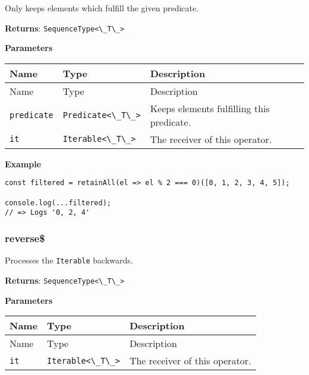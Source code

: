 Only keeps elements which fulfill the given predicate.

\textbf{Returns}: \passthrough{\lstinline!SequenceType<\_T\_>!}

\textbf{Parameters}

\begin{longtable}[]{
  >{\raggedright\arraybackslash}p{}
  >{\raggedright\arraybackslash}p{}
  >{\raggedright\arraybackslash}p{}@{}}

\toprule\noalign{}
Name & Type & Description \\
\midrule\noalign{}
\endfirsthead
\toprule\noalign{}
Name & Type & Description \\
\midrule\noalign{}
\endhead
\bottomrule\noalign{}
\endlastfoot
\passthrough{\lstinline!predicate!} &
\passthrough{\lstinline!Predicate<\_T\_>!} & Keeps elements fulfilling
this predicate. \\
\passthrough{\lstinline!it!} & \passthrough{\lstinline!Iterable<\_T\_>!}
& The receiver of this operator. \\
\end{longtable}

\textbf{Example}

\begin{lstlisting}[label=8a34b1cf-0a5d-4f78-876d-3d2977eb069b]
const filtered = retainAll(el => el % 2 === 0)([0, 1, 2, 3, 4, 5]);

console.log(...filtered);
// => Logs '0, 2, 4'
\end{lstlisting}

\hypertarget{cfab75a9-3295-4c45-be64-d5e9dc24f024}{%
\subsubsection{reverse\$}\label{cfab75a9-3295-4c45-be64-d5e9dc24f024}}

Processes the \passthrough{\lstinline!Iterable!} backwards.

\textbf{Returns}: \passthrough{\lstinline!SequenceType<\_T\_>!}

\textbf{Parameters}

\begin{longtable}[]{
  >{\raggedright\arraybackslash}p{}
  >{\raggedright\arraybackslash}p{}
  >{\raggedright\arraybackslash}p{}@{}}

\toprule\noalign{}
Name & Type & Description \\
\midrule\noalign{}
\endfirsthead
\toprule\noalign{}
Name & Type & Description \\
\midrule\noalign{}
\endhead
\bottomrule\noalign{}
\endlastfoot
\passthrough{\lstinline!it!} & \passthrough{\lstinline!Iterable<\_T\_>!}
& The receiver of this operator. \\
\end{longtable}

